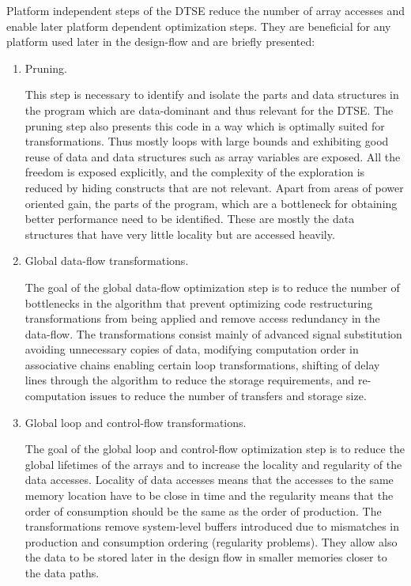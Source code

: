 Platform independent steps of the DTSE reduce the number of array accesses and enable later platform dependent optimization steps. 
They are beneficial for any platform used later in the design-flow and are briefly presented:

\begin{enumerate}

\item Pruning.

This step is necessary to identify and isolate the parts and data structures in the program which are data-dominant and thus relevant for the DTSE. 
The pruning step also presents this code in a way which is optimally suited for transformations. 
Thus mostly loops with large bounds and exhibiting good reuse of data and data structures such as array variables are exposed.
 All the freedom is exposed explicitly, and the complexity of the exploration is reduced by hiding constructs that are not relevant. 
 Apart from areas of power oriented gain, the parts of the program, which are a bottleneck for obtaining better performance need to be identified. 
 These are mostly the data structures that have very little locality but are accessed heavily.
 
 \item Global data-flow transformations.
 
 The goal of the global data-flow optimization step is to reduce the number of bottlenecks in the algorithm that prevent optimizing code restructuring transformations from being applied and remove access redundancy in the data-flow. 
 The transformations consist mainly of advanced signal substitution avoiding unnecessary copies of data, modifying computation order in associative chains enabling certain loop transformations, shifting of delay lines through the algorithm to reduce the storage requirements, and re-computation issues to reduce the number of transfers and storage size. 
 
 \item Global loop and control-flow transformations.
 
 The goal of the global loop and control-flow optimization step is to reduce the global lifetimes of the arrays and to increase the locality and regularity of the data accesses.
  Locality of data accesses means that the accesses to the same memory location have to be close in time and the regularity means that the order of consumption should be the same as the order of production. 
  The transformations remove system-level buffers introduced due to mismatches in production and consumption ordering (regularity problems). 
  They allow also the data to be stored later in the design flow in smaller memories closer to the data paths.
  

\end{enumerate}
